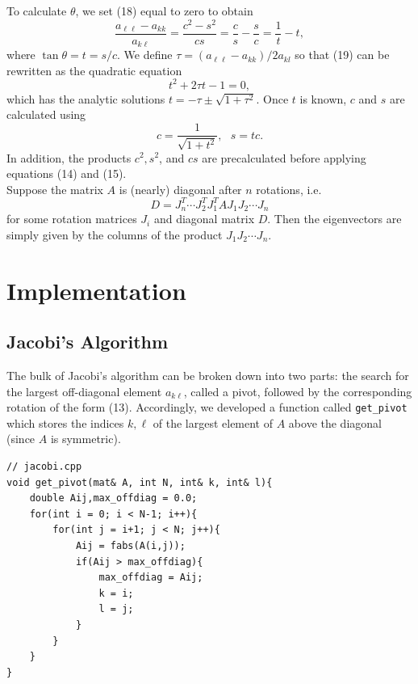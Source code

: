 \documentclass[prb,aps,twocolumn,showpacs,10pt]{revtex4-1}
\begin{document}
To calculate $\theta$, we set (18) equal to zero to obtain
\begin{equation}
\frac{a_{\ell\ell}-a_{kk}}{a_{k\ell}} = \frac{c^2-s^2}{cs} = \frac{c}{s}-\frac{s}{c} = \frac{1}{t}-t,
\end{equation}
where $\tan\theta=t=s/c$. We define $\tau = (a_{\ell\ell}-a_{kk})/2a_{kl}$ so that (19) can be rewritten as the quadratic equation
\begin{equation}
t^2+2\tau t - 1 = 0,
\end{equation}
which has the analytic solutions $t=-\tau\pm \sqrt{1+\tau^2}$. Once $t$ is known, $c$ and $s$ are calculated using 
\begin{equation}
c = \frac{1}{\sqrt{1+t^2}}, \ \ \  s=tc.
\end{equation}
In addition, the products $c^2, s^2$, and $cs$ are precalculated before applying equations (14) and (15).\\

Suppose the matrix $A$ is (nearly) diagonal after $n$ rotations, i.e. 
\begin{equation}
D=J_n^T \cdots J_2^T J_1^T A J_1 J_2 \cdots J_n
\end{equation}
for some rotation matrices $J_i$ and diagonal matrix $D$. Then the eigenvectors are simply given by the columns of the product $J_1J_2\cdots J_n$.

\section{Implementation}

\subsection{Jacobi's Algorithm}

The bulk of Jacobi's algorithm can be broken down into two parts: the search for the largest off-diagonal element $a_{k\ell}$, called a pivot, followed by the corresponding rotation of the form (13). Accordingly, we developed a function called \texttt{get\_pivot} which stores the indices $k,\ell$ of the largest element of $A$ above the diagonal (since $A$ is symmetric).

\begin{lstlisting}
// jacobi.cpp
void get_pivot(mat& A, int N, int& k, int& l){
	double Aij,max_offdiag = 0.0;
	for(int i = 0; i < N-1; i++){
		for(int j = i+1; j < N; j++){
			Aij = fabs(A(i,j));
			if(Aij > max_offdiag){
				max_offdiag = Aij;
				k = i;
				l = j;
			}
		}
	}
}
\end{lstlisting}
\end{document}
